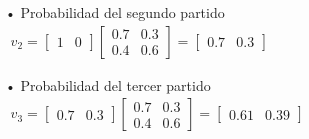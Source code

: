\documentclass[a4paper, 12pt]{article}
\begin{document}
\begin{enumerate}
{                • Probabilidad del segundo partido \\
                \(
                    \begin{array}{cccccc}
                        v_{2}
                        
                        =
                        
                        \begin{bmatrix}
                            1   &   0
                        \end{bmatrix}
                        
                        \begin{bmatrix}
                            0{.}7   &   0{.}3   \\
                            0{.}4   &   0{.}6
                        \end{bmatrix}
                        
                        =

                        \begin{bmatrix}
                            0{.}7   &   0{.}3
                        \end{bmatrix}
                    \end{array}
                \)

                • Probabilidad del tercer partido \\
                \(
                    \begin{array}{cccccc}
                        v_{3}

                        =

                        \begin{bmatrix}
                            0{.}7   &   0{.}3
                        \end{bmatrix}

                        \begin{bmatrix}
                            0{.}7   &   0{.}3   \\
                            0{.}4   &   0{.}6
                        \end{bmatrix}

                        =

                        \begin{bmatrix}
                            0{.}61  &   0{.}39
                        \end{bmatrix}
                    \end{array}
                \)
            }


\end{enumerate}
\end{document}
